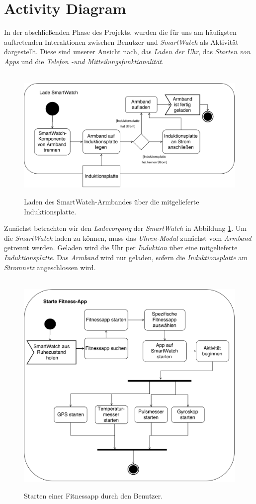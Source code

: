 \section{Activity Diagram}
In der abschließenden Phase des Projekts, wurden die für uns am häufigsten auftretenden Interaktionen zwischen Benutzer und \textit{SmartWatch} als Aktivität dargestellt. Diese sind unserer Ansicht nach, das \textit{Laden der Uhr}, das \textit{Starten von Apps} und die \textit{Telefon -und Mitteilungsfunktionalität}.\\
\begin{figure}[h]
\centering\
\includegraphics[width=\textwidth]{img/activityLaden}
\caption{Laden des SmartWatch-Armbandes über die mitgelieferte Induktionsplatte.}\label{fig:activityLaden}
\end{figure}
Zunächst betrachten wir den \textit{Ladevorgang} der \textit{SmartWatch} in Abbildung \ref{fig:activityLaden}.
Um die \textit{SmartWatch} laden zu können, muss das \textit{Uhren-Modul} zunächst vom \textit{Armband} getrennt werden. Geladen wird die Uhr per \textit{Induktion} über eine mitgelieferte \textit{Induktionsplatte}. Das \textit{Armband} wird nur geladen, sofern die \textit{Induktionsplatte} am \textit{Stromnetz} angeschlossen wird.  \\
\begin{figure}[h]
\centering\
\includegraphics[width=\textwidth]{img/activityFitness}
\caption{Starten einer Fitnessapp durch den Benutzer.}\label{fig:activityFitness}
\end{figure}
